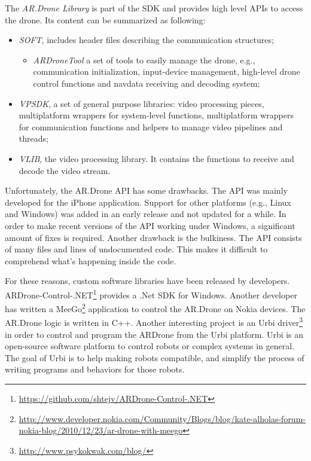 The \textit{AR.Drone Library} is part of the SDK and provides high level APIs to access the drone.
Its content can be summarized as following:
\begin{itemize}
\item \textit{SOFT}, includes header files describing the communication structures;
	\begin{itemize}
		\item \textit{ARDroneTool} a set of tools to easily manage the drone, e.g., communication initialization, input-device management, high-level drone control functions and navdata receiving and decoding system;
	\end{itemize}
\item \textit{VPSDK}, a set of general purpose libraries: video processing pieces, multiplatform wrappers for system-level functions, multiplatform wrappers for communication functions and helpers to manage video pipelines and threads;
\item \textit{VLIB}, the video processing library. It contains the functions to receive and decode the video stream.
\end{itemize}

Unfortunately, the AR.Drone API has some drawbacks.
The API was mainly developed for the iPhone application.
Support for other platforms (e.g., Linux and Windows) was added in an early release and not updated for a while.
In order to make recent versions of the API working under Windows, a significant amount of fixes is required.
Another drawback is the bulkiness.
The API consists of many files and lines of undocumented code.
This makes it difficult to comprehend what's happening inside the code.

For these reasons, custom software libraries have been released by developers.
ARDrone-Control-.NET\footnote{\url{https://github.com/shtejv/ARDrone-Control-.NET}} provides a .Net SDK for Windows.
Another developer has written a MeeGo\footnote{\url{http://www.developer.nokia.com/Community/Blogs/blog/kate-alholas-forum-nokia-blog/2010/12/23/ar-drone-with-meego}} application to control the AR.Drone on Nokia devices. The AR.Drone logic is written in C++.
Another interesting project is an Urbi driver\footnote{\url{http://www.psykokwak.com/blog/}} in order to control and program the ARDrone from the Urbi platform.
Urbi is an open-source software platform to control robots or complex systems in general. The goal of Urbi is to help making robots compatible, and simplify the process of writing programs and behaviors for those robots. 